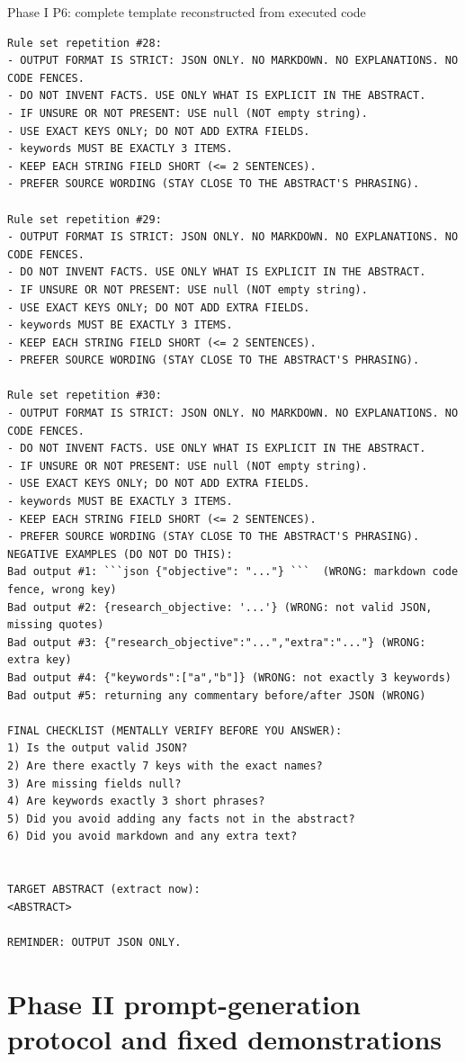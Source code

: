 \documentclass[fleqn,10pt]{wlscirep-authoryear}
\begin{document}
\begin{promptbox}{Phase I P6: complete template reconstructed from executed code}
\begin{lstlisting}[style=promptstyle]
Rule set repetition #28:
- OUTPUT FORMAT IS STRICT: JSON ONLY. NO MARKDOWN. NO EXPLANATIONS. NO CODE FENCES.
- DO NOT INVENT FACTS. USE ONLY WHAT IS EXPLICIT IN THE ABSTRACT.
- IF UNSURE OR NOT PRESENT: USE null (NOT empty string).
- USE EXACT KEYS ONLY; DO NOT ADD EXTRA FIELDS.
- keywords MUST BE EXACTLY 3 ITEMS.
- KEEP EACH STRING FIELD SHORT (<= 2 SENTENCES).
- PREFER SOURCE WORDING (STAY CLOSE TO THE ABSTRACT'S PHRASING).

Rule set repetition #29:
- OUTPUT FORMAT IS STRICT: JSON ONLY. NO MARKDOWN. NO EXPLANATIONS. NO CODE FENCES.
- DO NOT INVENT FACTS. USE ONLY WHAT IS EXPLICIT IN THE ABSTRACT.
- IF UNSURE OR NOT PRESENT: USE null (NOT empty string).
- USE EXACT KEYS ONLY; DO NOT ADD EXTRA FIELDS.
- keywords MUST BE EXACTLY 3 ITEMS.
- KEEP EACH STRING FIELD SHORT (<= 2 SENTENCES).
- PREFER SOURCE WORDING (STAY CLOSE TO THE ABSTRACT'S PHRASING).

Rule set repetition #30:
- OUTPUT FORMAT IS STRICT: JSON ONLY. NO MARKDOWN. NO EXPLANATIONS. NO CODE FENCES.
- DO NOT INVENT FACTS. USE ONLY WHAT IS EXPLICIT IN THE ABSTRACT.
- IF UNSURE OR NOT PRESENT: USE null (NOT empty string).
- USE EXACT KEYS ONLY; DO NOT ADD EXTRA FIELDS.
- keywords MUST BE EXACTLY 3 ITEMS.
- KEEP EACH STRING FIELD SHORT (<= 2 SENTENCES).
- PREFER SOURCE WORDING (STAY CLOSE TO THE ABSTRACT'S PHRASING).
NEGATIVE EXAMPLES (DO NOT DO THIS):
Bad output #1: ```json {"objective": "..."} ```  (WRONG: markdown code fence, wrong key)
Bad output #2: {research_objective: '...'} (WRONG: not valid JSON, missing quotes)
Bad output #3: {"research_objective":"...","extra":"..."} (WRONG: extra key)
Bad output #4: {"keywords":["a","b"]} (WRONG: not exactly 3 keywords)
Bad output #5: returning any commentary before/after JSON (WRONG)

FINAL CHECKLIST (MENTALLY VERIFY BEFORE YOU ANSWER):
1) Is the output valid JSON?
2) Are there exactly 7 keys with the exact names?
3) Are missing fields null?
4) Are keywords exactly 3 short phrases?
5) Did you avoid adding any facts not in the abstract?
6) Did you avoid markdown and any extra text?


TARGET ABSTRACT (extract now):
<ABSTRACT>

REMINDER: OUTPUT JSON ONLY.
\end{lstlisting}
\end{promptbox}


\section{Phase II prompt-generation protocol and fixed demonstrations}
\label{app:prompt-phase2}
\end{document}
